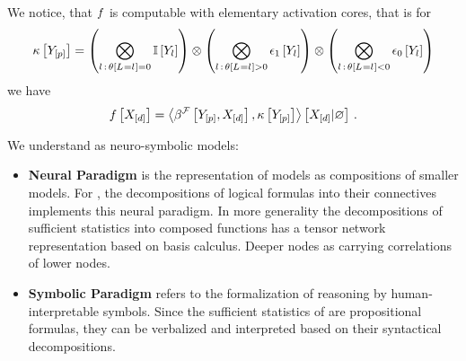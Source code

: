 We notice, that $f$ is computable with elementary activation cores, that is for
\begin{align*}
    \kappa\left[Y_{[p]}\right]
    = \left(\bigotimes_{l\,:\,\theta\left[L_{}=l_{}\right]=0} \mathbb{I}\left[Y_{l}\right]\right)
    \otimes \left(\bigotimes_{l\,:\,\theta\left[L_{}=l_{}\right]>0} \epsilon_{1}\left[Y_{l}\right]\right)
    \otimes \left(\bigotimes_{l\,:\,\theta\left[L_{}=l_{}\right]<0} \epsilon_{0}\left[Y_{l}\right]\right)
\end{align*}
we have
\begin{align*}
    f\left[X_{[d]}\right] =
    \left\langle \beta^{\mathcal{F}}\left[Y_{[p]},X_{[d]}\right],\kappa\left[Y_{[p]}\right]\right\rangle \left[ X_{[d]} | \varnothing \right] \, .
\end{align*}



We understand \HybridLogicNetworks{} as neuro-symbolic models:
\begin{itemize}
    \item \textbf{Neural Paradigm} is the representation of models as compositions of smaller models.
    For \HybridLogicNetworks{}, the decompositions of logical formulas into their connectives implements this neural paradigm.
    In more generality the decompositions of sufficient statistics into composed functions has a tensor network representation based on basis calculus.
    Deeper nodes as carrying correlations of lower nodes.
    \item \textbf{Symbolic Paradigm} refers to the formalization of reasoning by human-interpretable symbols.
    Since the sufficient statistics of \HybridLogicNetworks{} are propositional formulas, they can be verbalized and interpreted based on their syntactical decompositions.
\end{itemize}

